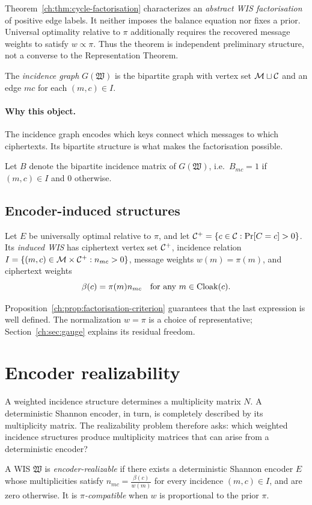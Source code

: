 \begin{remark}\label{ch:rem:cycle-factorisation-representation}
Theorem~\ref{ch:thm:cycle-factorisation} characterizes an
\emph{abstract WIS factorisation} of positive edge labels.  It neither
imposes the balance equation nor fixes a prior.  Universal optimality
relative to $\pi$ additionally requires the recovered message weights to
satisfy $w\propto\pi$.  Thus the theorem is independent preliminary
structure, not a converse to the Representation Theorem.
\end{remark}
\begin{definition}\label{ch:def:incidence-graph}
The \emph{incidence graph} $G(\mathfrak W)$ is the bipartite graph with vertex set $\mathcal{M}\sqcup\mathcal{C}$ and an edge $mc$ for each $(m,c)\in I$.
\end{definition}

\paragraph{Why this object.}
The incidence graph encodes which keys connect which messages to which ciphertexts.  Its bipartite structure is what makes the factorisation possible.

Let $B$ denote the bipartite incidence matrix of $G(\mathfrak W)$, i.e.\ $B_{mc}=1$ if $(m,c)\in I$ and $0$ otherwise.
\subsection{Encoder-induced structures}\label{ch:def:induced-wis}
\begin{definition}
Let $E$ be universally optimal relative to $\pi$, and let $\mathcal{C}^+=\{c\in\mathcal{C}:\Pr[C=c]>0\}$.  Its \emph{induced WIS} has ciphertext vertex set $\mathcal{C}^+$, incidence relation $I=\{(m,c)\in\mathcal{M}\times\mathcal{C}^+:n_{mc}>0\}$, message weights $w(m)=\pi(m)$, and ciphertext weights
\[
 \beta(c)=\pi(m)n_{mc}\quad\text{for any }m\in\operatorname{Cloak}(c).
\]
\end{definition}
Proposition~\ref{ch:prop:factorisation-criterion} guarantees that the last expression is well defined.  The normalization $w=\pi$ is a choice of representative; Section~\ref{ch:sec:gauge} explains its residual freedom.

\section{Encoder realizability}
A weighted incidence structure determines a multiplicity matrix $N$.
A deterministic Shannon encoder, in turn, is completely described by
its multiplicity matrix.  The realizability problem therefore asks:
which weighted incidence structures produce multiplicity matrices that
can arise from a deterministic encoder?
\begin{definition}[Realizability]\label{ch:def:realizable}
A WIS $\mathfrak W$ is \emph{encoder-realizable} if there exists a deterministic Shannon encoder $E$ whose multiplicities satisfy $n_{mc} = \frac{\beta(c)}{w(m)}$ for every incidence $(m,c)\in I$, and are zero otherwise.
It is \emph{$\pi$-compatible} when $w$ is proportional to the prior $\pi$.
\end{definition}

